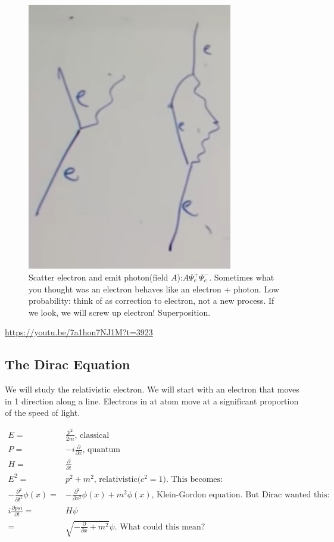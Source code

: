 \documentclass[]{article}
\begin{document}
\begin{figure}[H]
	\caption[Scatter electron and emit photon(field $A$):$A\Psi^+_e\Psi^-_e$]{Scatter electron and emit photon(field $A$):$A\Psi^+_e\Psi^-_e$. Sometimes what you thought was an electron behaves like an electron + photon. Low probability: think of as correction to electron, not a new process. If we look, we will screw up electron! Superposition.}
	\includegraphics[width=0.8\textwidth]{electron_scattering}
\end{figure}

\url{https://youtu.be/7a1hon7NJ1M?t=3923}

\subsection{The Dirac Equation}

We will study the relativistic electron. We will start with an electron that moves in 1 direction along a line. Electrons in at atom move at a significant proportion of the speed of light.  

\begin{align*}
E =& \frac{p^2}{2m} \text {, classical}\\
P =& -i \frac{\partial}{\partial x} \text{, quantum}\\
H = & \frac{\partial}{\partial t}\\
E^2 =& p^2 + m^2 \text{, relativistic($c^2=1$). This becomes:}\\
-\frac{\partial^2}{\partial t^2} \phi(x) =& -\frac{\partial^2}{\partial x^2}\phi(x) + m^2 \phi(x) \text{, Klein-Gordon equation. But Dirac wanted this:}\\
i \frac{\partial psi}{\partial t} =& H\psi\\
=& \sqrt{- \frac{\partial}{\partial x} + m^2} \psi \text{. What could this mean?}  
\end{align*}
\end{document}
